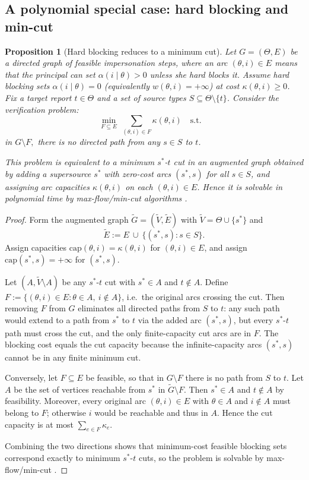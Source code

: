 \documentclass[final,3p,times]{elsarticle}
\theoremstyle{plain}
\newtheorem{proposition}{Proposition}
\theoremstyle{definition}
\newcommand{\1}{\mathbbm{1}}
\newcommand{\ThetaSet}{\Theta}
\begin{document}
\subsection{A polynomial special case: hard blocking and min-cut}

\begin{proposition}[Hard blocking reduces to a minimum cut]\label{prop:mincut}
Let $G=(\ThetaSet,E)$ be a directed graph of feasible impersonation steps, where an arc $(\theta,i)\in E$ means that
the principal can set $\alpha(i\mid\theta)>0$ unless she hard blocks it.
Assume hard blocking sets $\alpha(i\mid\theta)=0$ (equivalently $w(\theta,i)=+\infty$) at cost $\kappa(\theta,i)\ge 0$.
Fix a target report $t\in\ThetaSet$ and a set of source types $S\subseteq\ThetaSet\setminus\{t\}$.
Consider the verification problem:
\[
\min_{F\subseteq E}\ \sum_{(\theta,i)\in F}\kappa(\theta,i)
\quad\text{s.t.}\quad
\]
in $G\setminus F,$ there is no directed path from any $s\in S$ to $t$.

This problem is equivalent to a minimum $s^\ast$-$t$ cut in an augmented graph obtained by adding a supersource $s^\ast$
with zero-cost arcs $(s^\ast,s)$ for all $s\in S$, and assigning arc capacities $\kappa(\theta,i)$ on each $(\theta,i)\in E$.
Hence it is solvable in polynomial time by max-flow/min-cut algorithms \citep[Ch.~26]{CLRS2009}.
\end{proposition}

\begin{proof}
Form the augmented graph $\tilde G=(\tilde V,\tilde E)$ with $\tilde V=\ThetaSet\cup\{s^\ast\}$ and
\[
\tilde E:=E\ \cup\ \{(s^\ast,s): s\in S\}.
\]
Assign capacities $\mathrm{cap}(\theta,i)=\kappa(\theta,i)$ for $(\theta,i)\in E$, and assign $\mathrm{cap}(s^\ast,s)=+\infty$ for $(s^\ast,s)$.

Let $(A,\tilde V\setminus A)$ be any $s^\ast$-$t$ cut with $s^\ast\in A$ and $t\notin A$.
Define $F:=\{(\theta,i)\in E: \theta\in A,\ i\notin A\}$, i.e.\ the original arcs crossing the cut.
Then removing $F$ from $G$ eliminates all directed paths from $S$ to $t$:
any such path would extend to a path from $s^\ast$ to $t$ via the added arc $(s^\ast,s)$, but every
$s^\ast$-$t$ path must cross the cut, and the only finite-capacity cut arcs are in $F$.
The blocking cost equals the cut capacity because the infinite-capacity arcs $(s^\ast,s)$ cannot be in any finite minimum cut.

Conversely, let $F\subseteq E$ be feasible, so that in $G\setminus F$ there is no path from $S$ to $t$.
Let $A$ be the set of vertices reachable from $s^\ast$ in $\tilde G\setminus F$.
Then $s^\ast\in A$ and $t\notin A$ by feasibility. Moreover, every original arc $(\theta,i)\in E$ with $\theta\in A$ and $i\notin A$
must belong to $F$; otherwise $i$ would be reachable and thus in $A$. Hence the cut capacity is at most $\sum_{e\in F}\kappa_e$.

Combining the two directions shows that minimum-cost feasible blocking sets correspond exactly to minimum $s^\ast$-$t$ cuts,
so the problem is solvable by max-flow/min-cut \citep[Ch.~26]{CLRS2009}.
\end{proof}
 
\end{document}
